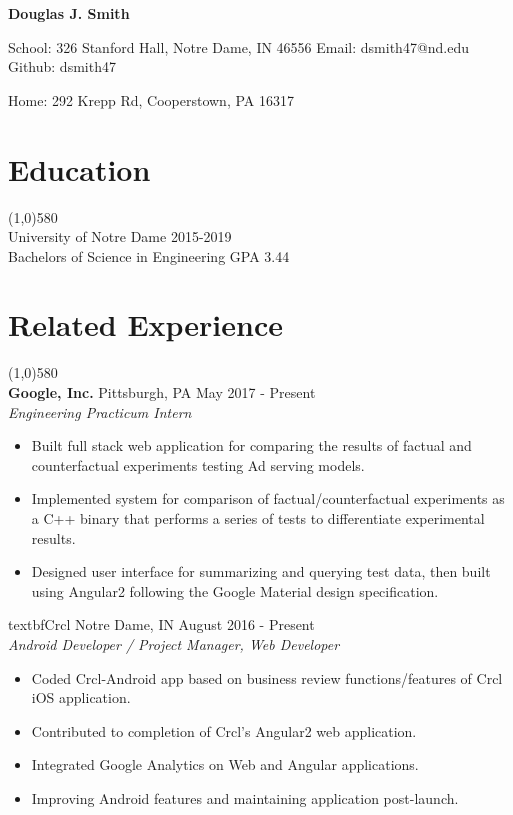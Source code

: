 \documentclass[9pt]{article}
\begin{document}
  \centerline{
    \LARGE\textbf{Douglas J. Smith}
  }
  \centerline{
    School: 326 Stanford Hall, Notre Dame, IN 46556
    Email: dsmith47@nd.edu
    Github: dsmith47
  }
  \centerline{
    Home: 292 Krepp Rd, Cooperstown, PA 16317
  }

  \vspace{-16pt}
  \section*{Education}
    \vspace{-16pt}
    \line(1,0){580}\\
    University of Notre Dame
    \hfill
    2015-2019
    \\
    Bachelors of Science in Engineering
    \hfill
    GPA 3.44
    \\
  \vspace{-28pt}
  \section*{Related Experience}
    \vspace{-16pt}
    \line(1,0){580}\\
    \textbf{Google, Inc.}
    \hfill
    Pittsburgh, PA
    \hfill
    May 2017 - Present
    \\
    \textit{Engineering Practicum Intern}
    \begin{itemize}
      \item Built full stack web application for comparing the results of factual and counterfactual experiments testing Ad serving models.
      \item Implemented system for comparison of factual/counterfactual experiments as a C++ binary that performs a series of tests to differentiate experimental results.
      \item Designed user interface for summarizing and querying test data, then built using Angular2 following the Google Material design specification.
    \end{itemize}
  
    textbf{Crcl}
    \hfill
    Notre Dame, IN
    \hfill
    August 2016 - Present
    \\
    \textit{Android Developer / Project Manager, Web Developer}
    \begin{itemize}
      \item Coded Crcl-Android app based on business review functions/features of Crcl iOS application.
      \item Contributed to completion of Crcl's Angular2 web application.
      \item Integrated Google Analytics on Web and Angular applications.
      \item Improving Android features and maintaining application post-launch.
    \end{itemize}
    
\end{document}
